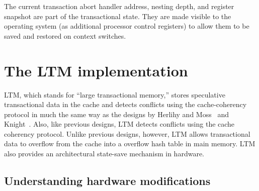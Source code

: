 
The current transaction abort handler address, nesting depth, and
register snapshot are part of the transactional state.  They are made
visible to the operating system (as additional processor control
registers) to allow them to be saved and restored on context switches.

\section{The LTM implementation}\label{sec:ltm}


LTM, which stands for ``large
transactional memory,'' stores speculative transactional data in the
cache and detects conflicts using the cache-coherency protocol in much
the same way as the designs by Herlihy and Moss~\cite{HerlihyMo92} and
Knight~\cite{Knight86,Knight89}.  Also, like previous designs, LTM
detects conflicts using the cache coherency protocol.  Unlike previous
designs, however, LTM allows transactional data to overflow from the
cache into a overflow hash table in main memory.  LTM also provides an
architectural state-save mechanism in hardware.


\subsection{Understanding hardware modifications}

